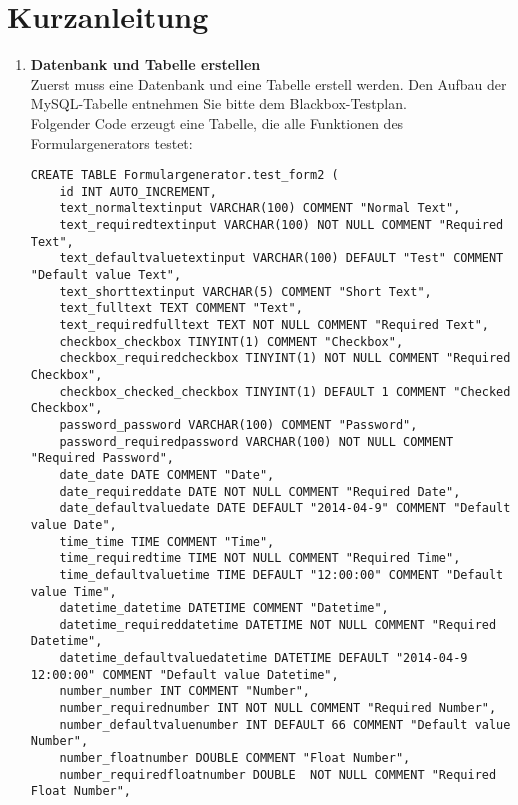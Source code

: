 \documentclass[11pt,a4paper,titlepage,portrait,ngerman]{scrartcl}
\title{\docTitle}
\subtitle{\docSubtitle}
\author{\large\scshape\docAuthor}
\date{\normalsize\scshape\docDate}
\begin{document}
\maketitle
\newpage
\tableofcontents
\newpage
\section{Kurzanleitung}
\begin{enumerate}
	\item{
		\textbf{Datenbank und Tabelle erstellen} \\
		Zuerst muss eine Datenbank und eine Tabelle erstell werden. Den Aufbau der MySQL-Tabelle entnehmen Sie bitte dem Blackbox-Testplan. \\
		Folgender Code erzeugt eine Tabelle, die alle Funktionen des Formulargenerators testet: \par
		\small{\begin{lstlisting} 
CREATE TABLE Formulargenerator.test_form2 (
    id INT AUTO_INCREMENT,
    text_normaltextinput VARCHAR(100) COMMENT "Normal Text",
    text_requiredtextinput VARCHAR(100) NOT NULL COMMENT "Required Text",
    text_defaultvaluetextinput VARCHAR(100) DEFAULT "Test" COMMENT "Default value Text",
    text_shorttextinput VARCHAR(5) COMMENT "Short Text",
    text_fulltext TEXT COMMENT "Text",
    text_requiredfulltext TEXT NOT NULL COMMENT "Required Text",
    checkbox_checkbox TINYINT(1) COMMENT "Checkbox",
    checkbox_requiredcheckbox TINYINT(1) NOT NULL COMMENT "Required Checkbox",
    checkbox_checked_checkbox TINYINT(1) DEFAULT 1 COMMENT "Checked Checkbox",
    password_password VARCHAR(100) COMMENT "Password",
    password_requiredpassword VARCHAR(100) NOT NULL COMMENT "Required Password",
    date_date DATE COMMENT "Date",
    date_requireddate DATE NOT NULL COMMENT "Required Date",
    date_defaultvaluedate DATE DEFAULT "2014-04-9" COMMENT "Default value Date",
    time_time TIME COMMENT "Time",
    time_requiredtime TIME NOT NULL COMMENT "Required Time",
    time_defaultvaluetime TIME DEFAULT "12:00:00" COMMENT "Default value Time",
    datetime_datetime DATETIME COMMENT "Datetime",
    datetime_requireddatetime DATETIME NOT NULL COMMENT "Required Datetime",
    datetime_defaultvaluedatetime DATETIME DEFAULT "2014-04-9 12:00:00" COMMENT "Default value Datetime",
    number_number INT COMMENT "Number",
    number_requirednumber INT NOT NULL COMMENT "Required Number",
    number_defaultvaluenumber INT DEFAULT 66 COMMENT "Default value Number",
    number_floatnumber DOUBLE COMMENT "Float Number",
    number_requiredfloatnumber DOUBLE  NOT NULL COMMENT "Required Float Number",

\end{lstlisting}}}
\end{enumerate}
\end{document}
